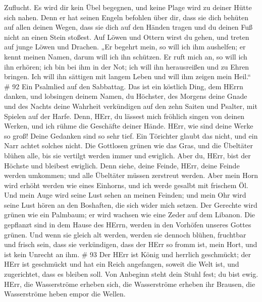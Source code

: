 Zuflucht.  Es wird dir kein Übel begegnen, und keine Plage
wird zu deiner Hütte sich nahen.  Denn er hat seinen Engeln
befohlen über dir, dass sie dich behüten auf allen deinen Wegen,
 dass sie dich auf den Händen tragen und du deinen Fuß
nicht an einen Stein stoßest.  Auf Löwen und Ottern wirst
du gehen, und treten auf junge Löwen und Drachen.  „Er
begehrt mein, so will ich ihm aushelfen; er kennt meinen Namen, darum
will ich ihn schützen.  Er ruft mich an, so will ich ihn
erhören; ich bin bei ihm in der Not; ich will ihn herausreißen und zu
Ehren bringen.  Ich will ihn sättigen mit langem Leben und
will ihm zeigen mein Heil.`` \# 92  Ein Psalmlied auf den
Sabbattag.  Das ist ein köstlich Ding, dem HErrn danken, und
lobsingen deinem Namen, du Höchster,  des Morgens deine
Gnade und des Nachts deine Wahrheit verkündigen  auf den
zehn Saiten und Psalter, mit Spielen auf der Harfe.  Denn,
HErr, du lässest mich fröhlich singen von deinen Werken, und ich rühme
die Geschäfte deiner Hände.  HErr, wie sind deine Werke so
groß! Deine Gedanken sind so sehr tief.  Ein Törichter
glaubt das nicht, und ein Narr achtet solches nicht.  Die
Gottlosen grünen wie das Gras, und die Übeltäter blühen alle, bis sie
vertilgt werden immer und ewiglich.  Aber du, HErr, bist der
Höchste und bleibest ewiglich.  Denn siehe, deine Feinde,
HErr, deine Feinde werden umkommen; und alle Übeltäter müssen zerstreut
werden.  Aber mein Horn wird erhöht werden wie eines
Einhorns, und ich werde gesalbt mit frischem Öl.  Und mein
Auge wird seine Lust sehen an meinen Feinden; und mein Ohr wird seine
Lust hören an den Boshaften, die sich wider mich setzen. 
Der Gerechte wird grünen wie ein Palmbaum; er wird wachsen wie eine
Zeder auf dem Libanon.  Die gepflanzt sind in dem Hause des
HErrn, werden in den Vorhöfen unseres Gottes grünen.  Und
wenn sie gleich alt werden, werden sie dennoch blühen, fruchtbar und
frisch sein,  dass sie verkündigen, dass der HErr so fromm
ist, mein Hort, und ist kein Unrecht an ihm. \# 93  Der HErr
ist König und herrlich geschmückt; der HErr ist geschmückt und hat ein
Reich angefangen, soweit die Welt ist, und zugerichtet, dass es bleiben
soll.  Von Anbeginn steht dein Stuhl fest; du bist ewig.
 HErr, die Wasserströme erheben sich, die Wasserströme
erheben ihr Brausen, die Wasserströme heben empor die Wellen.
